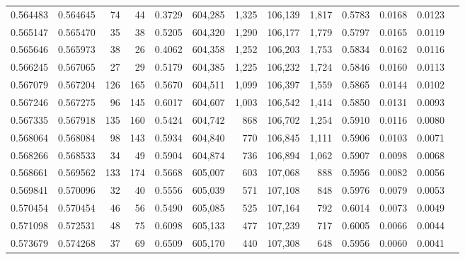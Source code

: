 \begin{tabular}{rrrrrrrrrrrrr}
0.564483 & 0.564645 &    74 &    44 &                                     0.3729 & 604,285 &   1,325 & 106,139 &   1,817 & 0.5783 & 0.0168 & 0.0123 \\
0.565147 & 0.565470 &    35 &    38 &                                     0.5205 & 604,320 &   1,290 & 106,177 &   1,779 & 0.5797 & 0.0165 & 0.0119 \\
0.565646 & 0.565973 &    38 &    26 &                                     0.4062 & 604,358 &   1,252 & 106,203 &   1,753 & 0.5834 & 0.0162 & 0.0116 \\
0.566245 & 0.567065 &    27 &    29 &                                     0.5179 & 604,385 &   1,225 & 106,232 &   1,724 & 0.5846 & 0.0160 & 0.0113 \\
0.567079 & 0.567204 &   126 &   165 &                                     0.5670 & 604,511 &   1,099 & 106,397 &   1,559 & 0.5865 & 0.0144 & 0.0102 \\
0.567246 & 0.567275 &    96 &   145 &                                     0.6017 & 604,607 &   1,003 & 106,542 &   1,414 & 0.5850 & 0.0131 & 0.0093 \\
0.567335 & 0.567918 &   135 &   160 &                                     0.5424 & 604,742 &     868 & 106,702 &   1,254 & 0.5910 & 0.0116 & 0.0080 \\
0.568064 & 0.568084 &    98 &   143 &                                     0.5934 & 604,840 &     770 & 106,845 &   1,111 & 0.5906 & 0.0103 & 0.0071 \\
0.568266 & 0.568533 &    34 &    49 &                                     0.5904 & 604,874 &     736 & 106,894 &   1,062 & 0.5907 & 0.0098 & 0.0068 \\
0.568661 & 0.569562 &   133 &   174 &                                     0.5668 & 605,007 &     603 & 107,068 &     888 & 0.5956 & 0.0082 & 0.0056 \\
0.569841 & 0.570096 &    32 &    40 &                                     0.5556 & 605,039 &     571 & 107,108 &     848 & 0.5976 & 0.0079 & 0.0053 \\
0.570454 & 0.570454 &    46 &    56 &                                     0.5490 & 605,085 &     525 & 107,164 &     792 & 0.6014 & 0.0073 & 0.0049 \\
0.571098 & 0.572531 &    48 &    75 &                                     0.6098 & 605,133 &     477 & 107,239 &     717 & 0.6005 & 0.0066 & 0.0044 \\
0.573679 & 0.574268 &    37 &    69 &                                     0.6509 & 605,170 &     440 & 107,308 &     648 & 0.5956 & 0.0060 & 0.0041 \\

\end{tabular}
